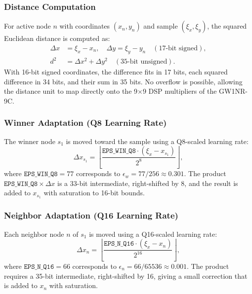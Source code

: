 \documentclass[conference]{IEEEtran}
\begin{document}
\subsubsection{Distance Computation}
For active node $n$ with coordinates $(x_n, y_n)$ and sample $(\xi_x, \xi_y)$, the squared Euclidean distance is computed as:
\begin{align}
\Delta x &= \xi_x - x_n, \quad \Delta y = \xi_y - y_n \quad (\text{17-bit signed}), \\
d^2 &= \Delta x^2 + \Delta y^2 \quad (\text{35-bit unsigned}).
\end{align}
With 16-bit signed coordinates, the difference fits in 17 bits, each squared difference in 34 bits, and their sum in 35 bits. No overflow is possible, allowing the distance unit to map directly onto the 9$\times$9 DSP multipliers of the GW1NR-9C.

\subsubsection{Winner Adaptation (Q8 Learning Rate)}
The winner node $s_1$ is moved toward the sample using a Q8-scaled learning rate:
\begin{equation}
\Delta x_{s_1} = \left\lfloor \frac{\texttt{EPS\_WIN\_Q8} \cdot (\xi_x - x_{s_1})}{2^8} \right\rfloor,
\end{equation}
where $\texttt{EPS\_WIN\_Q8} = 77$ corresponds to $\epsilon_w = 77/256 \approx 0.301$. The product $\texttt{EPS\_WIN\_Q8} \times \Delta x$ is a 33-bit intermediate, right-shifted by 8, and the result is added to $x_{s_1}$ with saturation to 16-bit bounds.

\subsubsection{Neighbor Adaptation (Q16 Learning Rate)}
Each neighbor node $n$ of $s_1$ is moved using a Q16-scaled learning rate:
\begin{equation}
\Delta x_n = \left\lfloor \frac{\texttt{EPS\_N\_Q16} \cdot (\xi_x - x_n)}{2^{16}} \right\rfloor,
\end{equation}
where $\texttt{EPS\_N\_Q16} = 66$ corresponds to $\epsilon_n = 66/65536 \approx 0.001$. The product requires a 35-bit intermediate, right-shifted by 16, giving a small correction that is added to $x_n$ with saturation.
\end{document}
